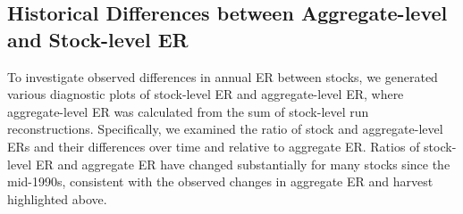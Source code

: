 \documentclass[french,11pt]{book}
\begin{document}
\endgroup{} \endgroup{}

\clearpage

\subsection{Historical Differences between Aggregate-level and Stock-level ER}\label{historical-differences-between-aggregate-level-and-stock-level-er}

To investigate observed differences in annual ER between stocks, we generated various diagnostic plots of stock-level ER and aggregate-level ER, where aggregate-level ER was calculated from the sum of stock-level run reconstructions. Specifically, we examined the ratio of stock and aggregate-level ERs and their differences over time and relative to aggregate ER. Ratios of stock-level ER and aggregate ER have changed substantially for many stocks since the mid-1990s, consistent with the observed changes in aggregate ER and harvest highlighted above.
\end{document}

